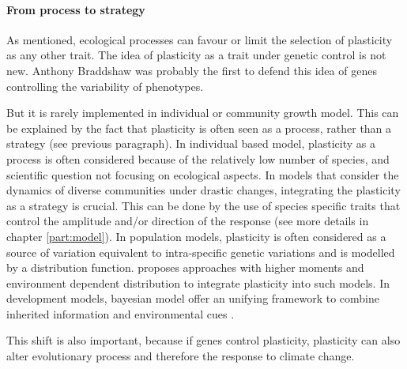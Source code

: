 \paragraph{From process to strategy}

As mentioned, ecological processes can favour or limit the selection of plasticity as any other trait. The idea of plasticity as a trait under genetic control is not new. Anthony Braddshaw was probably the first to defend this idea of genes controlling the variability of phenotypes. 

But it is rarely implemented in individual or community growth model. This can be explained by the fact that plasticity is often seen as a process, rather than a strategy (see previous paragraph). In individual based model, plasticity as a process is often considered because of the relatively low number of species, and scientific question not focusing on ecological aspects. In models that consider the dynamics of diverse communities under drastic changes, integrating the plasticity as a strategy is crucial. This can be done by the use of species specific traits that control the amplitude and/or direction of the response (see more details in chapter \ref{part:model}). In population models, plasticity is often considered as a source of variation equivalent to intra-specific genetic variations and is modelled by a distribution function. \cite{dewitt_expanding_2016} proposes approaches with higher moments and environment dependent distribution to integrate plasticity into such models. In development models, bayesian model offer an unifying framework to combine inherited information and environmental cues \parencite{stamps_bayesian_2016}.


This shift is also important, because if genes control plasticity, plasticity can also alter evolutionary process and therefore the response to climate change\cite{pfennig_phenotypic_2010, matesanz_global_2010, nicotra_plant_2010}.


